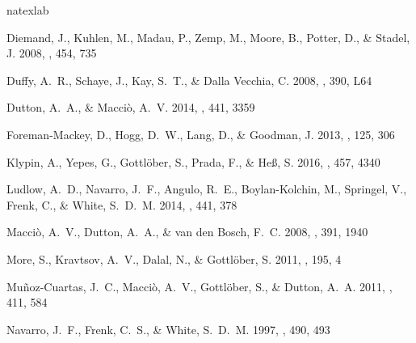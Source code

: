 \documentclass{emulateapj}
\begin{document}

%
\begin{thebibliography}{15}
\expandafter\ifx\csname natexlab\endcsname\relax\def\natexlab#1{#1}\fi

{Diemand}, J., {Kuhlen}, M., {Madau}, P., {Zemp}, M., {Moore}, B., {Potter},
  D., \& {Stadel}, J. 2008, \nat, 454, 735

{Duffy}, A.~R., {Schaye}, J., {Kay}, S.~T., \& {Dalla Vecchia}, C. 2008,
  \mnras, 390, L64

{Dutton}, A.~A., \& {Macci{\`o}}, A.~V. 2014, \mnras, 441, 3359

{Foreman-Mackey}, D., {Hogg}, D.~W., {Lang}, D., \& {Goodman}, J. 2013, \pasp,
  125, 306

{Klypin}, A., {Yepes}, G., {Gottl{\"o}ber}, S., {Prada}, F., \& {He{\ss}}, S.
  2016, \mnras, 457, 4340

{Ludlow}, A.~D., {Navarro}, J.~F., {Angulo}, R.~E., {Boylan-Kolchin}, M.,
  {Springel}, V., {Frenk}, C., \& {White}, S.~D.~M. 2014, \mnras, 441, 378

{Macci{\`o}}, A.~V., {Dutton}, A.~A., \& {van den Bosch}, F.~C. 2008, \mnras,
  391, 1940

{More}, S., {Kravtsov}, A.~V., {Dalal}, N., \& {Gottl{\"o}ber}, S. 2011, \apjs,
  195, 4

{Mu{\~n}oz-Cuartas}, J.~C., {Macci{\`o}}, A.~V., {Gottl{\"o}ber}, S., \&
  {Dutton}, A.~A. 2011, \mnras, 411, 584

{Navarro}, J.~F., {Frenk}, C.~S., \& {White}, S.~D.~M. 1997, \apj, 490, 493


\end{thebibliography}
\end{document}
